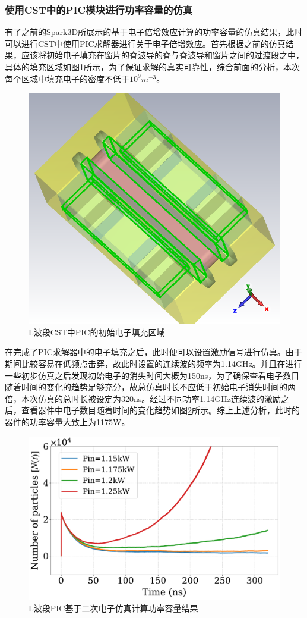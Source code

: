 \documentclass[master]{thesis-uestc}
\begin{document}
\subsubsection{使用CST中的PIC模块进行功率容量的仿真}
有了之前的Spark3D所展示的基于电子倍增效应计算的功率容量的仿真结果，此时可以进行CST中使用PIC求解器进行关于电子倍增效应。首先根据之前的仿真结果，应该将初始电子填充在窗片的脊波导的脊与脊波导和窗片之间的过渡段之中，具体的填充区域如图\ref{fig:L波段CST电子填充方法}所示，为了保证求解的真实可靠性，综合前面的分析，本次每个区域中填充电子的密度不低于$10^9 m^{-3}$。
\begin{figure}[!htb]
    \centering
    \includegraphics[width=0.25\linewidth]{pic/chapter4/L波段CST电子填充方法.png}
    \caption{L波段CST中PIC的初始电子填充区域}
    \label{fig:L波段CST电子填充方法}
\end{figure}

在完成了PIC求解器中的电子填充之后，此时便可以设置激励信号进行仿真。由于期间比较容易在低频点击穿，故此时设置的连续波的频率为1.14GHz。并且在进行一些初步仿真之后发现初始电子的消失时间大概为150ns，为了确保查看电子数目随着时间的变化的趋势足够充分，故总仿真时长不应低于初始电子消失时间的两倍，本次仿真的总时长被设定为320ns。经过不同功率1.14GHz连续波的激励之后，查看器件中电子数目随着时间的变化趋势如图\ref{fig:L波段PIC基于二次电子仿真计算功率容量结果}所示。综上上述分析，此时的器件的功率容量大致上为1175W。
\begin{figure}[!htb]
    \centering
    \includegraphics[width=0.5\linewidth]{pic/chapter4/particle_time_chapter4.pdf}
    \caption{L波段PIC基于二次电子仿真计算功率容量结果}
    \label{fig:L波段PIC基于二次电子仿真计算功率容量结果}
\end{figure}
\end{document}
